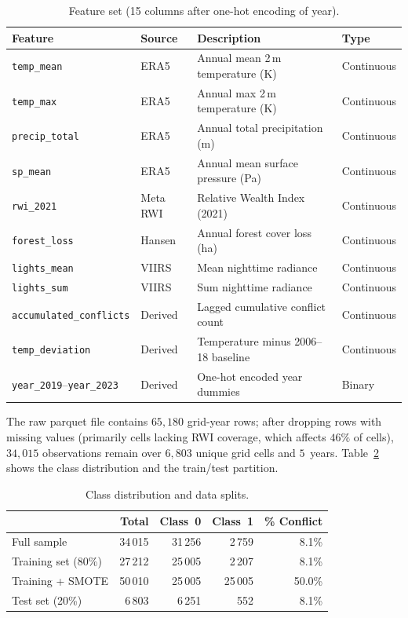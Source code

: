 \documentclass[11pt,a4paper]{article}
\begin{document}
\begin{table}[H]
  \centering
  \small
  \caption{Feature set (15 columns after one-hot encoding of year).}
  \label{tab:features}
  \begin{tabular}{llll}
    \toprule
    Feature & Source & Description & Type \\
    \midrule
    \texttt{temp\_mean} & ERA5 & Annual mean 2\,m temperature (K) & Continuous \\
    \texttt{temp\_max} & ERA5 & Annual max 2\,m temperature (K) & Continuous \\
    \texttt{precip\_total} & ERA5 & Annual total precipitation (m) & Continuous \\
    \texttt{sp\_mean} & ERA5 & Annual mean surface pressure (Pa) & Continuous \\
    \texttt{rwi\_2021} & Meta RWI & Relative Wealth Index (2021) & Continuous \\
    \texttt{forest\_loss} & Hansen & Annual forest cover loss (ha) & Continuous \\
    \texttt{lights\_mean} & VIIRS & Mean nighttime radiance & Continuous \\
    \texttt{lights\_sum} & VIIRS & Sum nighttime radiance & Continuous \\
    \texttt{accumulated\_conflicts} & Derived & Lagged cumulative conflict count & Continuous \\
    \texttt{temp\_deviation} & Derived & Temperature minus 2006--18 baseline & Continuous \\
    \texttt{year\_2019}--\texttt{year\_2023} & Derived & One-hot encoded year dummies & Binary \\
    \bottomrule
  \end{tabular}
\end{table}

The raw parquet file contains $65{,}180$ grid-year rows; after dropping rows with missing values (primarily cells lacking RWI coverage, which affects $46\%$ of cells), $34{,}015$ observations remain over $6{,}803$ unique grid cells and $5$~years. Table~\ref{tab:class} shows the class distribution and the train/test partition.

\begin{table}[H]
  \centering
  \small
  \caption{Class distribution and data splits.}
  \label{tab:class}
  \begin{tabular}{lrrrr}
    \toprule
    & Total & Class~0 & Class~1 & \% Conflict \\
    \midrule
    Full sample & 34\,015 & 31\,256 & 2\,759 & 8.1\% \\
    Training set (80\%) & 27\,212 & 25\,005 & 2\,207 & 8.1\% \\
    Training + SMOTE & 50\,010 & 25\,005 & 25\,005 & 50.0\% \\
    Test set (20\%) & 6\,803 & 6\,251 & 552 & 8.1\% \\
    \bottomrule
  \end{tabular}
\end{table}
\end{document}
